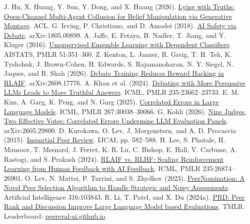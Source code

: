 \documentclass[12pt,letterpaper]{article}
\begin{document}
\begin{thebibliography}{}
 J. Hu, X. Huang, Y. Sun, Y. Dong, and X. Huang (2026). \href{https://arxiv.org/abs/2601.01685}{Lying with Truths: Open-Channel Multi-Agent Collusion for Belief Manipulation via Generative Montage}. ACL.
 G. Irving, P. Christiano, and D. Amodei (2018). \href{https://arxiv.org/abs/1805.00899}{AI Safety via Debate}. arXiv:1805.00899.
 A. Jaffe, E. Fetaya, B. Nadler, T. Jiang, and Y. Kluger (2016). \href{https://proceedings.mlr.press/v51/jaffe16.html}{Unsupervised Ensemble Learning with Dependent Classifiers}. AISTATS, PMLR 51:351--360.
 Z. Kenton, L. Janzer, R. Greig, T. H. Teh, K. Tyshchuk, J. Brown-Cohen, H. Edwards, S. Rajamanoharan, N. Y. Siegel, N. Jaques, and R. Shah (2026). \href{https://arxiv.org/abs/2608.17776}{Debate Training Reduces Reward Hacking in RLAIF}. arXiv:2608.17776.
 A. Khan et al. (2024). \href{https://proceedings.mlr.press/v235/khan24a.html}{Debating with More Persuasive LLMs Leads to More Truthful Answers}. ICML, PMLR 235:23662--23733.
 E. M. Kim, A. Garg, K. Peng, and N. Garg (2025). \href{https://proceedings.mlr.press/v267/kim25e.html}{Correlated Errors in Large Language Models}. ICML, PMLR 267:30038--30066.
 G. Kohli (2026). \href{https://arxiv.org/abs/2605.29800}{Nine Judges, Two Effective Votes: Correlated Errors Undermine LLM Evaluation Panels}. arXiv:2605.29800.
 D. Kurokawa, O. Lev, J. Morgenstern, and A. D. Procaccia (2015). \href{https://www.ijcai.org/Abstract/15/088}{Impartial Peer Review}. IJCAI, pp. 582--588.
 H. Lee, S. Phatale, H. Mansoor, T. Mesnard, J. Ferret, K. R. Lu, C. Bishop, E. Hall, V. Carbune, A. Rastogi, and S. Prakash (2024). \href{https://proceedings.mlr.press/v235/lee24t.html}{RLAIF vs. RLHF: Scaling Reinforcement Learning from Human Feedback with AI Feedback}. ICML, PMLR 235:26874--26901.
 O. Lev, N. Mattei, P. Turrini, and S. Zhydkov (2023). \href{https://doi.org/10.1016/j.artint.2022.103843}{PeerNomination: A Novel Peer Selection Algorithm to Handle Strategic and Noisy Assessments}. Artificial Intelligence 316:103843.
 R. Li, T. Patel, and X. Du (2024a). \href{https://openreview.net/forum?id=YVD1QqWRaj}{PRD: Peer Rank and Discussion Improve Large Language Model based Evaluations}. TMLR. Leaderboard: \href{https://peereval-ai.github.io}{peereval-ai.github.io}.

\end{thebibliography}
\end{document}
